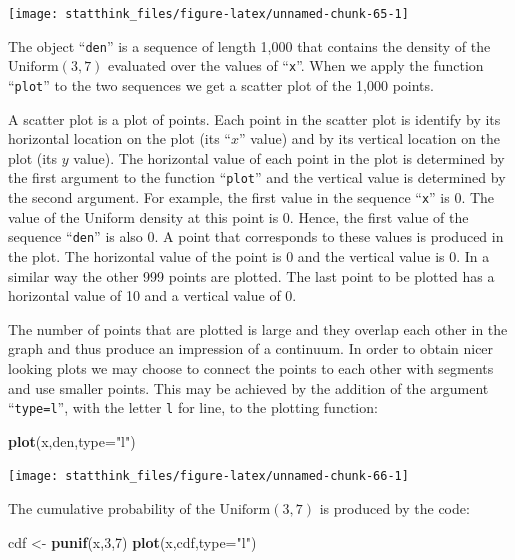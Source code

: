 \documentclass[]{krantz}
\makeatletter
\newenvironment{Shaded}{\begin{snugshade}}{\end{snugshade}}
\newcommand{\DataTypeTok}[1]{\textcolor[rgb]{0.13,0.29,0.53}{#1}}
\newcommand{\DecValTok}[1]{\textcolor[rgb]{0.00,0.00,0.81}{#1}}
\newcommand{\KeywordTok}[1]{\textcolor[rgb]{0.13,0.29,0.53}{\textbf{#1}}}
\newcommand{\NormalTok}[1]{#1}
\newcommand{\StringTok}[1]{\textcolor[rgb]{0.31,0.60,0.02}{#1}}
\newenvironment{kframe}{%
\medskip{}
\setlength{\fboxsep}{.8em}
 \def\at@end@of@kframe{}%
 \ifinner\ifhmode%
  \def\at@end@of@kframe{\end{minipage}}%
  \begin{minipage}{\columnwidth}%
 \fi\fi%
 \def\FrameCommand##1{\hskip\@totalleftmargin \hskip-\fboxsep
 \colorbox{shadecolor}{##1}\hskip-\fboxsep
     \hskip-\linewidth \hskip-\@totalleftmargin \hskip\columnwidth}%
 \MakeFramed {\advance\hsize-\width
   \@totalleftmargin\z@ \linewidth\hsize
   \@setminipage}}%
 {\par\unskip\endMakeFramed%
 \at@end@of@kframe}
\renewenvironment{Shaded}{\begin{kframe}}{\end{kframe}}
\theoremstyle{definition}
\theoremstyle{definition}
\theoremstyle{definition}
\theoremstyle{remark}
\makeatother
\begin{document}
\begin{center}\texttt{[image: statthink\_files/figure-latex/unnamed-chunk-65-1]} \end{center}

The object ``\texttt{den}'' is a sequence of length 1,000 that contains the
density of the \(\mathrm{Uniform}(3,7)\) evaluated over the values of
``\texttt{x}''. When we apply the function ``\texttt{plot}'' to the two sequences we get a
scatter plot of the 1,000 points.

A scatter plot is a plot of points. Each point in the scatter plot is
identify by its horizontal location on the plot (its ``\(x\)'' value) and by
its vertical location on the plot (its \(y\) value). The horizontal value
of each point in the plot is determined by the first argument to the
function ``\texttt{plot}'' and the vertical value is determined by the second
argument. For example, the first value in the sequence ``\texttt{x}'' is 0. The
value of the Uniform density at this point is 0. Hence, the first value
of the sequence ``\texttt{den}'' is also 0. A point that corresponds to these
values is produced in the plot. The horizontal value of the point is 0
and the vertical value is 0. In a similar way the other 999 points are
plotted. The last point to be plotted has a horizontal value of 10 and a
vertical value of 0.

The number of points that are plotted is large and they overlap each
other in the graph and thus produce an impression of a continuum. In
order to obtain nicer looking plots we may choose to connect the points
to each other with segments and use smaller points. This may be achieved
by the addition of the argument ``\texttt{type=l}'', with the letter \texttt{l} for
line, to the plotting function:

\begin{Shaded}
\begin{Highlighting}[]
\KeywordTok{plot}\NormalTok{(x,den,}\DataTypeTok{type=}\StringTok{"l"}\NormalTok{)}
\end{Highlighting}
\end{Shaded}

\begin{center}\texttt{[image: statthink\_files/figure-latex/unnamed-chunk-66-1]} \end{center}

The cumulative probability of the \(\mathrm{Uniform}(3,7)\) is produced by the code:

\begin{Shaded}
\begin{Highlighting}[]
\NormalTok{cdf <-}\StringTok{ }\KeywordTok{punif}\NormalTok{(x,}\DecValTok{3}\NormalTok{,}\DecValTok{7}\NormalTok{)}
\KeywordTok{plot}\NormalTok{(x,cdf,}\DataTypeTok{type=}\StringTok{"l"}\NormalTok{)}
\end{Highlighting}
\end{Shaded}
\end{document}
